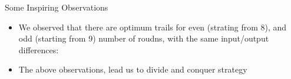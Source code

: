 \documentclass{beamer}
\begin{document}

\begin{frame}{Some Inspiring Observations}
\begin{itemize}
\item We observed that there are optimum trails for even (strating from 8), and odd (starting from 9) number of roudns, with the same input/output differences: 
\end{itemize}
\begin{center}
\end{center}
\begin{itemize}
\item The above observations, lead us to divide and conquer strategy
\end{itemize}
\end{frame}
\end{document}
